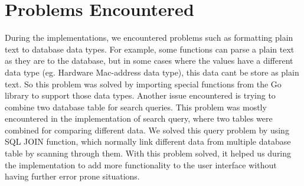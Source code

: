 \section{Problems Encountered}
During the implementations, we encountered problems such as formatting plain text to database data types. For example, some functions can parse a plain text as they are to the database, but in some cases where the values have a different data type (eg. Hardware Mac-address data type), this data cant be store as plain text.  So this problem was solved by importing special functions from the Go library to support those data types. Another issue encountered is trying to combine two database table for search queries. This problem was mostly encountered in the implementation of search query, where two tables were combined for comparing different data.  We solved this query problem by using SQL JOIN function, which normally link different data from multiple database table by scanning through them. With this problem solved, it helped us during the implementation to add more functionality to the user interface without having further error prone situations.




